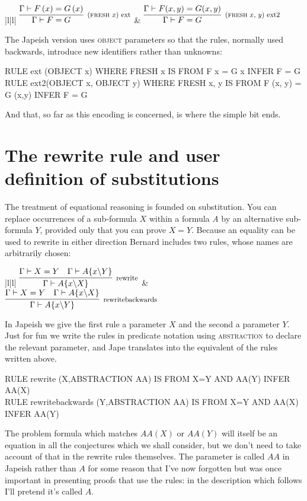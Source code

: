 \begin{ruletab}{|l|l|}
\hline
$\infer[\reason{(\textsc{fresh} $x$) ext}]
       {\Gamma  |- F=G}
       {\Gamma  |- F\left( x\right) =G\left( x\right) }$
 & 
$\infer[\reason{(\textsc{fresh} $x$, $y$) ext2}]
       {\Gamma  |- F=G}
       {\Gamma  |- F(x,y)=G(x,y)}$
\\
\hline
\end{ruletab}

The Japeish version uses \textsc{object} parameters so that the rules, normally used backwards, introduce new identifiers rather than unknowns:
\begin{japeish}
RULE ext (OBJECT x) WHERE FRESH x IS FROM  F x = G x INFER F = G\\
RULE ext2(OBJECT x, OBJECT y) WHERE FRESH x, y IS FROM  F (x, y) = G (x,y)     INFER F = G
\end{japeish}
And that, so far as this encoding is concerned, is where the simple bit ends.

\section{The rewrite rule and user definition of substitutions}

The treatment of equational reasoning is founded on substitution. You can replace occurrences of a sub-formula $X$ within a formula \textit{A} by an alternative sub-formula $Y$, provided only that you can prove $X=Y$. Because an equality can be used to rewrite in either direction Bernard includes two rules, whose names are arbitrarily chosen:

\begin{ruletab}{|l|l|} 
\hline
$\infer[\reason{rewrite}]
	{\Gamma|-A\{x\backslash X\}}
	{\Gamma|-X=Y & \Gamma|-A\{x\backslash Y\}}$
&
$\infer[\reason{rewritebackwards}]
	{\Gamma |-A\{x\backslash Y\}}
	{\Gamma |-X=Y & \Gamma|- A\{x\backslash X\}}$
\\
\hline
\end{ruletab}

In Japeish we give the first rule a parameter $X$ and the second a parameter $Y$. Just for fun we write the rules in predicate notation using \textsc{abstraction} to declare the relevant parameter, and Jape translates into the equivalent of the rules written above.
\begin{japeish}
RULE   rewrite (X,ABSTRACTION AA)           IS FROM X=Y AND AA(Y) INFER AA(X)\\
RULE   rewritebackwards (Y,ABSTRACTION AA)  IS FROM X=Y AND AA(X) INFER AA(Y)
\end{japeish}
The problem formula which matches $AA(X)$ or $AA(Y)$ will itself be an equation in all the conjectures which we shall consider, but we don't need to take account of that in the rewrite rules themselves. The parameter is called $AA$ in Japeish rather than $A$ for some reason that I've now forgotten but was once important in presenting proofs that use the rules: in the description which follows I'll pretend it's called $A$.

